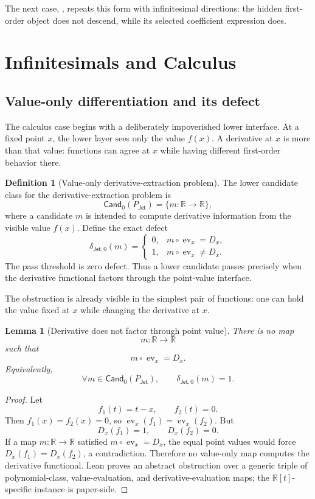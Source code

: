 \documentclass[11pt]{article}
\newcommand{\R}{\mathbb R}
\newcommand{\Jet}{\mathsf{Jet}}
\newcommand{\ev}{\operatorname{ev}}
\newtheorem{lemma}[theorem]{Lemma}
\theoremstyle{definition}
\newtheorem{definition}[theorem]{Definition}
\begin{document}
The next case, , repeats this form with infinitesimal
directions: the hidden first-order object does not descend, while its selected
coefficient expression does.
 \section{Infinitesimals and Calculus}\label{sec:calculus}

\subsection{Value-only differentiation and its defect}
\label{subsec:jet-value-only-defect}

The calculus case begins with a deliberately impoverished lower interface.  At
a fixed point \(x\), the lower layer sees only the value \(f(x)\).  A derivative
at \(x\) is more than that value: functions can agree at \(x\) while having
different first-order behavior there.

\begin{definition}[Value-only derivative-extraction problem]
\label{def:jet-value-only-problem}
The lower candidate class for the derivative-extraction problem is
\[
\mathsf{Cand}_0(P_{\Jet})=\{m:\mathbb R\to\mathbb R\},
\]
where a candidate \(m\) is intended to compute derivative information from the visible value \(f(x)\).  Define the exact defect
\[
\delta_{\Jet,0}(m)=
\begin{cases}
0,& m\circ\ev_x=D_x,\\
1,& m\circ\ev_x\neq D_x.
\end{cases}
\]
The pass threshold is zero defect.  Thus a lower candidate passes precisely when the derivative functional factors through the point-value interface.
\end{definition}

The obstruction is already visible in the simplest pair of functions: one can
hold the value fixed at \(x\) while changing the derivative at \(x\).

\begin{lemma}[Derivative does not factor through point value]
\label{lem:jet-derivative-not-value-factor}
There is no map
\[
m:\mathbb R\to\mathbb R
\]
such that
\[
m\circ\ev_x=D_x.
\]
Equivalently,
\[
\forall m\in\mathsf{Cand}_0(P_{\Jet}),
\qquad
\delta_{\Jet,0}(m)=1.
\]
\end{lemma}

\begin{proof}
Let
\[
f_1(t)=t-x,
\qquad
f_2(t)=0.
\]
Then \(f_1(x)=f_2(x)=0\), so \(\ev_x(f_1)=\ev_x(f_2)\).  But
\[
D_x(f_1)=1,
\qquad
D_x(f_2)=0.
\]
If a map \(m:\R\to\R\) satisfied \(m\circ\ev_x=D_x\), the equal point values
would force \(D_x(f_1)=D_x(f_2)\), a contradiction.  Therefore no value-only
map computes the derivative functional.  Lean proves an abstract obstruction
over a generic triple of polynomial-class, value-evaluation, and
derivative-evaluation maps; the \(\R[t]\)-specific instance is paper-side.
\end{proof}
\end{document}
